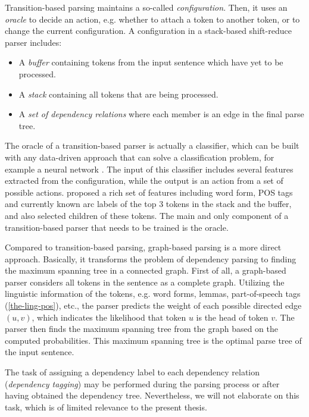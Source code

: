 Transition-based parsing maintains a so-called \textit{configuration}. Then, it uses an \textit{oracle} to decide an action, e.g. whether to attach a token to another token, or to change the current configuration. A configuration in a stack-based shift-reduce parser includes:

\begin{itemize}
    \item A \textit{buffer} containing tokens from the input sentence which have yet to be processed.
    \item A \textit{stack} containing all tokens that are being processed.
    \item A \textit{set of dependency relations} where each member is an edge in the final parse tree.
\end{itemize}

The oracle of a transition-based parser is actually a classifier, which can be built with any data-driven approach that can solve a classification problem, for example a neural network \citep{chen2014fast}.
The input of this classifier includes several features extracted from the configuration, while the output is an action from a set of possible actions.
\citeauthor{chen2014fast} proposed a rich set of features including word form, POS tags and currently known arc labels of the top 3 tokens in the stack and the buffer, and also selected children of these tokens.
The main and only component of a transition-based parser that needs to be trained is the oracle.

Compared to transition-based parsing, graph-based parsing is a more direct approach.
Basically, it transforms the problem of dependency parsing to finding the maximum spanning tree in a connected graph.
First of all, a graph-based parser considers all tokens in the sentence as a complete graph.
Utilizing the linguistic information of the tokens, e.g. word forms, lemmas, part-of-speech tags (\cref{the-ling-pos}), etc., the parser predicts the weight of each possible directed edge $(u,v)$, which indicates the likelihood that token $u$ is the head of token $v$.
The parser then finds the maximum spanning tree from the graph based on the computed probabilities.
This maximum spanning tree is the optimal parse tree of the input sentence.

The task of assigning a dependency label to each dependency relation (\textit{dependency tagging}) may be performed during the parsing process or after having obtained the dependency tree. Nevertheless, we will not elaborate on this task, which is of limited relevance to the present thesis.

